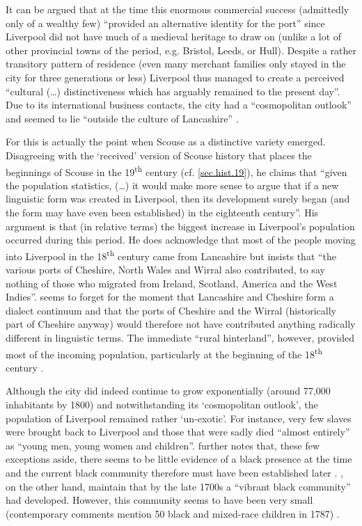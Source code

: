 It can be argued that at the time this enormous commercial success (admittedly only of a wealthy few) ``provided an alternative identity for the port'' since Liverpool did not have much of a medieval heritage to draw on (unlike a lot of other provincial towns of the period, e.g. Bristol, Leeds, or Hull).
Despite a rather transitory pattern of residence (even many merchant families only stayed in the city for three generations or less) Liverpool thus managed to create a perceived ``cultural (\ldots) distinctiveness which has arguably remained to the present day''. Due to its international business contacts, the city had a ``cosmopolitan outlook'' and seemed to lie ``outside the culture of Lancashire'' \citep[152--154]{longmore2006}.

For \citet[28]{crowley2012} this is actually the point when Scouse as a distinctive variety emerged.
Disagreeing with the `received' version of Scouse history that places the beginnings of Scouse in the 19\textsuperscript{th} century (cf. \ref{sec.hist.19}), he claims that ``given the population statistics, (\dots) it would make more sense to argue that if a new linguistic form was created in Liverpool, then its development surely began (and the form may have even been established) in the eighteenth century''.
His argument is that (in relative terms) the biggest increase in Liverpool's population occurred during this period.
He does acknowledge that most of the people moving into Liverpool in the 18\textsuperscript{th} century came from Lancashire but insists that ``the various ports of Cheshire, North Wales and Wirral also contributed, to say nothing of those who migrated from Ireland, Scotland, America and the West Indies''.
\citeauthor{crowley2012} seems to forget for the moment that Lancashire and Cheshire form a dialect continuum and that the ports of Cheshire and the Wirral (historically part of Cheshire anyway) would therefore not have contributed anything radically different in linguistic terms.
The immediate ``rural hinterland'', however, provided most of the incoming population, particularly at the beginning of the 18\textsuperscript{th} century \parencite[cf.][119]{longmore2006}.

Although the city did indeed continue to grow exponentially (around 77,000 inhabitants by 1800) and notwithstanding its `cosmopolitan outlook', the population of Liverpool remained rather `un-exotic'.
For instance, very few slaves were brought back to Liverpool and those that were sadly died ``almost entirely'' as ``young men, young women and children''.
\citeauthor{longmore2006} further notes that, these few exceptions aside, there seems to be little evidence of a black presence at the time and the current black community therefore must have been established later \citeyearpar[cf.][161 and 169]{longmore2006}. \citeauthor{belchemmacraild2006}, on the other hand, maintain that by the late 1700s a ``vibrant black community'' had developed. However, this community seems to have been very small (contemporary comments mention 50 black and mixed-race children in 1787) \citeyearpar[324]{belchemmacraild2006}.

